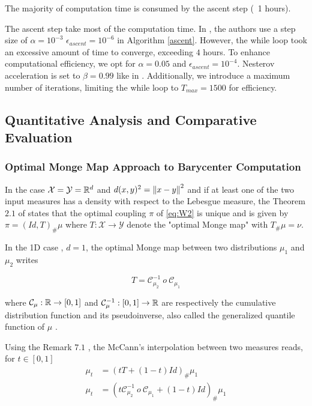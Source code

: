 The majority of computation time is consumed by the ascent step (~1 hours). 

The ascent step take most of the computation time. In \cite{claici_stochastic_2018}, the authors use a step size of $\alpha = 10^{-3}$ $\epsilon_{ascent} = 10^{-6}$ in Algorithm \ref{ascent}. However, the while loop took an excessive amount of time to converge, exceeding $4$ hours. To enhance computational efficiency, we opt for $\alpha = 0.05$ and $\epsilon_{ascent} = 10^{-4}$. Nesterov acceleration is set to $\beta = 0.99$ like in \cite{claici_stochastic_2018}. Additionally, we introduce a maximum number of iterations, limiting the while loop to $T_{max} = 1500$ for efficiency.


\subsection{Quantitative Analysis and Comparative Evaluation}

\subsubsection{Optimal Monge Map Approach to Barycenter Computation}
\label{sec:monge_map}

In the case $\mathcal{X} = \mathcal{Y} = \mathbb{R}^d$ and $d(x, y)^2 = \left\lVert x  - y\right\rVert^2$ and if at least one of the two input measures has a density with respect to the Lebesgue measure, the Theorem $2.1$ of \cite{peyre_computational_2020} states that the optimal coupling $\pi$ of \eqref{eq:W2} is unique and is given by $\pi = (Id, T)_\#\mu$ where $T : \mathcal{X} \rightarrow \mathcal{Y}$ denote the "optimal Monge map" with $T_\#\mu = \nu$. 

In the 1D case \cite[see][Remark 2.30]{peyre_computational_2020}, $d=1$, the optimal Monge map between two distributions $\mu_1$ and $\mu_2$ writes 

\begin{equation}\label{eq:monge_map}
    T=\mathcal{C}^{-1}_{\mu_2}\ o\ \mathcal{C}_{\mu_1} 
\end{equation}

where $\mathcal{C}_{\mu} : \mathbb{R} \rightarrow [0, 1]$ and $\mathcal{C}^{-1}_\mu : [0, 1]\rightarrow \mathbb{R} $ are respectively the cumulative distribution function and its pseudoinverse, also called the generalized quantile function of $\mu$ .

Using the Remark $7.1$ \cite{peyre_computational_2020}, the McCann's interpolation \cite{mccann_convexity_1997} between two measures reads, for $t\in [0, 1]$ 
\begin{align}
    \mu_t &= (tT + (1-t)Id)_\#\mu_1 \nonumber \\
    \mu_t &= (t\mathcal{C}^{-1}_{\mu_2}\ o\ \mathcal{C}_{\mu_1} + (1-t)Id)_\#\mu_1 \label{eq:mccann}
\end{align}

